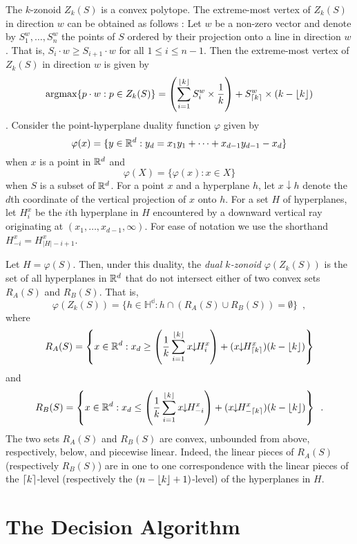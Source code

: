 \documentclass[lotsofwhite]{patmorin}
\newcommand{\argmax}{\mathrm{argmax}}
\newcommand{\drop}{\!\!\downarrow\!\!}
\newcommand{\dual}{\varphi}
\begin{document}
The $k$-zonoid $Z_k(S)$ is a convex polytope.  The extreme-most vertex
of $Z_k(S)$ in direction $w$ can be obtained as follows
\cite{gmXX,beXX}:  Let $w$ be a non-zero vector and denote 
by $S_1^w,\ldots,S_n^w$ the points of $S$
ordered by their projection onto a line in direction $w$.  That is,
$S_i\cdot w \ge S_{i+1}\cdot w$ for all $1\le i\le n-1$.  Then the
extreme-most vertex of $Z_k(S)$ in direction $w$ is given by 
\[  
\argmax\{p\cdot w: p\in Z_k(S)\} =
        \left(\sum_{i=1}^{\floor{k}} S_i^w\times\frac{1}{k}\right) +
          S_{\ceil{k}}^w\times(k-\floor{k})
\]
\cite{beXX,gmXX}.
Consider the point-hyperplane duality function
$\dual$ given by 
\[
    \dual(x)=\{y\in\R^d : y_d = x_1y_1 +\cdots +x_{d-1}y_{d-1} - x_d \}
\] 
when $x$ is a point in $\mathbb{R}^d$ and
\[
     \dual(X) = \{\dual(x) : x\in X\}
\]
when $S$ is a subset of $\mathbb{R}^d$.  For a point $x$
and a hyperplane $h$, let $x\drop h$ denote the $d$th coordinate of
the vertical projection of $x$ onto $h$.  For a set $H$ of
hyperplanes, let $H_i^x$ be the $i$th hyperplane in $H$ encountered by
a downward vertical ray originating at $(x_1,\ldots,x_{d-1},\infty)$.
For ease of notation we use the shorthand $H_{-i}^x=H_{|H|-i+1}^x$.

Let $H=\dual(S)$.  Then,
under this duality, the \emph{dual $k$-zonoid} $\dual(Z_k(S))$ is the set 
of all hyperplanes in $\mathbb{R}^d$
that do not intersect either of two convex sets $R_A(S)$ and $R_B(S)$.
That is,
\[
     \dual(Z_k(S)) = \{ h\in\mathbb{H^d} : h\cap(R_A(S)\cup R_B(S)) = \emptyset \} \enspace ,
\]
where
\begin{equation}
   R_A(S) = \left\{x\in\R^d: x_d \ge 
\left(\frac{1}{k}\sum_{i=1}^{\floor{k}} x\drop H_i^x\right) +
          (x\drop H_{\ceil{k}}^x)(k-\floor{k}) \right\}  \eqlabel{ra}
\end{equation} 
and
\begin{equation}
   R_B(S) = \left\{x\in\R^d: x_d \le 
\left(\frac{1}{k}\sum_{i=1}^{\floor{k}} x\drop H_{-i}^x\right) +
          (x\drop H_{-\ceil{k}}^x)(k-\floor{k}) \right\} \enspace .
\end{equation}
The two sets $R_A(S)$ and $R_B(S)$ are convex, unbounded from above,
respectively, below, and piecewise linear.  Indeed, the linear pieces
of $R_A(S)$ (respectively $R_B(S)$) are in one to one correspondence
with the linear pieces of the $\left\lceil k \right\rceil$-level (respectively
the $(n-\left\lfloor k \right\rfloor+1)$-level) of the hyperplanes in $H$.


\section{The Decision Algorithm}
\end{document}

